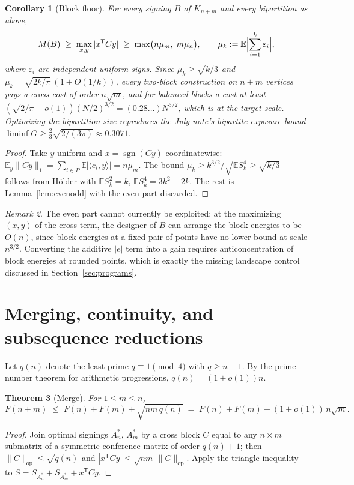 \documentclass[11pt]{article}
\newtheorem{theorem}{Theorem}[section]
\newtheorem{corollary}[theorem]{Corollary}
\theoremstyle{remark}
\newtheorem{remark}[theorem]{Remark}
\newcommand{\E}{\mathbb E}
\begin{document}
\begin{corollary}[Block floor]\label{cor:floor}
For every signing $B$ of $K_{n+m}$ and every bipartition as above,
\[
 M(B)\;\ge\;\max_{x,y}|x^{\mathsf T}Cy|
 \;\ge\;\max\bigl(n\mu_m,\;m\mu_n\bigr),
 \qquad \mu_k:=\E\Bigl|\sum_{i=1}^k\varepsilon_i\Bigr|,
\]
where $\varepsilon_i$ are independent uniform signs. Since
$\mu_k\ge\sqrt{k/3}$ and $\mu_k=\sqrt{2k/\pi}\,(1+O(1/k))$, every
two-block construction on $n+m$ vertices pays a cross cost of order
$n\sqrt m$, and for balanced blocks a cost at least
$(\sqrt{2/\pi}-o(1))(N/2)^{3/2}=(0.28\ldots)N^{3/2}$, which is at the
target scale. Optimizing the bipartition size reproduces the July
note's bipartite-exposure bound
$\liminf G\ge\tfrac23\sqrt{2/(3\pi)}\approx0.3071$.
\end{corollary}
\begin{proof}
Take $y$ uniform and $x=\operatorname{sgn}(Cy)$ coordinatewise:
$\E_y\|Cy\|_1=\sum_{i\in P}\E|\langle c_i,y\rangle|=n\mu_m$. The bound
$\mu_k\ge k^{3/2}/\sqrt{\E S_k^4}\ge\sqrt{k/3}$ follows from
H\"older with $\E S_k^2=k$, $\E S_k^4=3k^2-2k$. The rest is
Lemma~\ref{lem:evenodd} with the even part discarded.
\end{proof}

\begin{remark}
The even part cannot currently be exploited: at the maximizing
$(x,y)$ of the cross term, the designer of $B$ can arrange the block
energies to be $O(n)$, since block energies at a fixed pair of points
have no lower bound at scale $n^{3/2}$. Converting the additive
$|e|$ term into a gain requires anticoncentration of block energies at
rounded points, which is exactly the missing landscape control
discussed in Section~\ref{sec:programs}.
\end{remark}

\section{Merging, continuity, and subsequence reductions}\label{sec:merge}

Let $q(n)$ denote the least prime $q\equiv1\pmod4$ with $q\ge n-1$. By
the prime number theorem for arithmetic progressions,
$q(n)=(1+o(1))n$.

\begin{theorem}[Merge]\label{thm:merge}
For $1\le m\le n$,
\[
 F(n+m)\;\le\;F(n)+F(m)+\sqrt{nm\,q(n)}
 \;=\;F(n)+F(m)+(1+o(1))\,n\sqrt m .
\]
\end{theorem}
\begin{proof}
Join optimal signings $A^*_n$, $A^*_m$ by a cross block $C$ equal to
any $n\times m$ submatrix of a symmetric conference matrix of order
$q(n)+1$; then
$\|C\|_{\mathrm{op}}\le\sqrt{q(n)}$ and
$|x^{\mathsf T}Cy|\le\sqrt{nm}\,\|C\|_{\mathrm{op}}$. Apply the triangle
inequality to $S=S_{A^*_n}+S_{A^*_m}+x^{\mathsf T}Cy$.
\end{proof}
\end{document}
